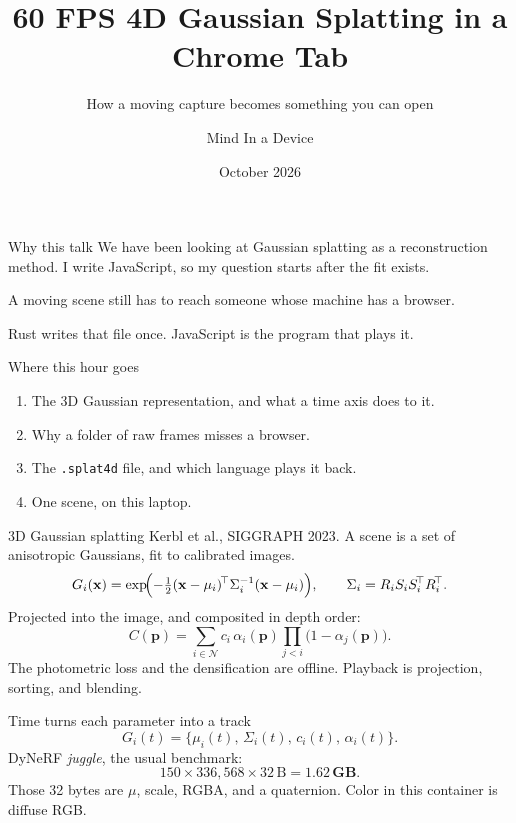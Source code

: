 \documentclass[aspectratio=169,10pt]{beamer}
\title[4DGS in a Chrome tab]{60 FPS 4D Gaussian Splatting in a Chrome Tab}
\subtitle{How a moving capture becomes something you can open}
\author{Mind In a Device}
\institute{Monthly Tech Talk}
\date{October 2026}
\begin{document}
\begin{frame}
  \titlepage
\end{frame}

\begin{frame}{Why this talk}
  We have been looking at Gaussian splatting as a reconstruction method. I write JavaScript, so my question starts after the fit exists.

  \vspace{0.7em}
  A moving scene still has to reach someone whose machine has a browser.

  \vspace{0.7em}
  Rust writes that file once. JavaScript is the program that plays it.
\end{frame}

\begin{frame}{Where this hour goes}
  \begin{enumerate}
    \item The 3D Gaussian representation, and what a time axis does to it.
    \item Why a folder of raw frames misses a browser.
    \item The \texttt{.splat4d} file, and which language plays it back.
    \item One scene, on this laptop.
  \end{enumerate}
\end{frame}

\begin{frame}{3D Gaussian splatting}
  Kerbl et al., SIGGRAPH 2023. A scene is a set of anisotropic Gaussians, fit to calibrated images.
  \[
    G_i(\mathbf{x})
    =\exp\!\Bigl(-\tfrac12(\mathbf{x}-\mu_i)^{\!\top}\Sigma_i^{-1}(\mathbf{x}-\mu_i)\Bigr),
    \qquad
    \Sigma_i = R_i S_i S_i^{\!\top} R_i^{\!\top}.
  \]
  Projected into the image, and composited in depth order:
  \[
    C(\mathbf{p})
    =\sum_{i\in\mathcal{N}}
      c_i\,\alpha_i(\mathbf{p})
      \prod_{j<i}\bigl(1-\alpha_j(\mathbf{p})\bigr).
  \]
  \small
  The photometric loss and the densification are offline. Playback is projection, sorting, and blending.
\end{frame}

\begin{frame}{Time turns each parameter into a track}
  \[
    G_i(t)=\{\mu_i(t),\,\Sigma_i(t),\,c_i(t),\,\alpha_i(t)\}.
  \]
  DyNeRF \textit{juggle}, the usual benchmark:
  \[
    150 \times 336{,}568 \times 32\,\mathrm{B} = \mathbf{1.62\,GB}.
  \]
  Those 32 bytes are $\mu$, scale, RGBA, and a quaternion. Color in this container is diffuse RGB.
\end{frame}
\end{document}

